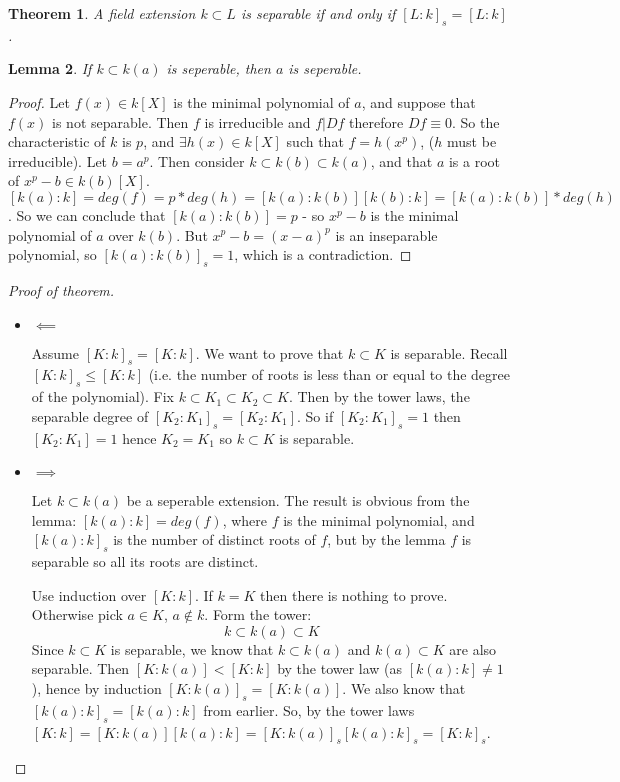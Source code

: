 \documentclass{article}
\theoremstyle{definition}
\theoremstyle{plain}%
\newtheorem{thm}{Theorem}[section]
\newtheorem{lem}[thm]{Lemma}
\theoremstyle{remark}
\begin{document}
\begin{thm}
    A field extension $k \subset L$ is separable if and only if $[L:k]_s = [L:k]$.
\end{thm}

\begin{lem}
    If $k \subset k(a)$ is seperable, then $a$ is seperable.
\end{lem}

\begin{proof}
    Let $f(x) \in k[X]$ is the minimal polynomial of $a$, and suppose that $f(x)$ is not separable. Then $f$ is irreducible and $f | Df$ therefore $Df \equiv 0$. So the characteristic of $k$ is $p$, and $\exists h(x) \in k[X]$ such that $f = h(x^p)$, ($h$ must be irreducible). Let $b = a^p$. Then consider $k \subset k(b) \subset k(a)$, and that $a$ is a root of $x^p - b \in k(b)[X]$. $[k(a) : k] = deg (f) = p * deg (h) = [k(a) : k(b)][k(b) :k] = [k(a) : k(b)] * deg (h)$. So we can conclude that $[k(a) : k(b)] = p$ - so $x^p - b$ is the minimal polynomial of $a$ over $k(b)$. But $x^p - b = (x-a)^p$ is an inseparable polynomial, so $[k(a) : k(b)]_s = 1$, which is a contradiction.
\end{proof}

\begin{proof}[Proof of theorem]
    \begin{itemize}
        \item $\impliedby$
        
        Assume $[K : k]_s = [K : k]$. We want to prove that $k \subset K$ is separable. Recall $[K : k]_s \le [K : k]$ (i.e. the number of roots is less than or equal to the degree of the polynomial). Fix $k \subset K_1 \subset K_2 \subset K$. Then by the tower laws, the separable degree of $[K_2 : K_1]_s = [K_2 : K_1]$. So if $[K_2 : K_1]_s = 1$ then $[K_2 : K_1] = 1$ hence $K_2 = K_1$ so $k \subset K$ is separable.
        
        \item $\implies$
        
        Let $k \subset k(a)$ be a seperable extension. The result is obvious from the lemma: $[k(a) : k] = deg(f)$, where $f$ is the minimal polynomial, and $[k(a) : k]_s$ is the number of distinct roots of $f$, but by the lemma $f$ is separable so all its roots are distinct.
        
        Use induction over $[K : k]$. If $k = K$ then there is nothing to prove. Otherwise pick $a \in K$, $a \not \in k$. Form the tower:
        \[k \subset k(a) \subset K\]
        Since $k \subset K$ is separable, we know that $k \subset k(a)$ and $k(a) \subset K$ are also separable. Then $[K : k(a)] < [K : k]$ by the tower law (as $[k(a) : k ] \ne 1$), hence by induction $[K : k(a)]_s = [K : k(a)]$. We also know that $[k(a) : k]_s = [k(a) : k]$ from earlier. So, by the tower laws $[K : k] = [K : k(a)] [k(a) : k] = [K : k(a)]_s [k(a) : k]_s = [K : k]_s$.
    \end{itemize}
\end{proof}
\end{document}
